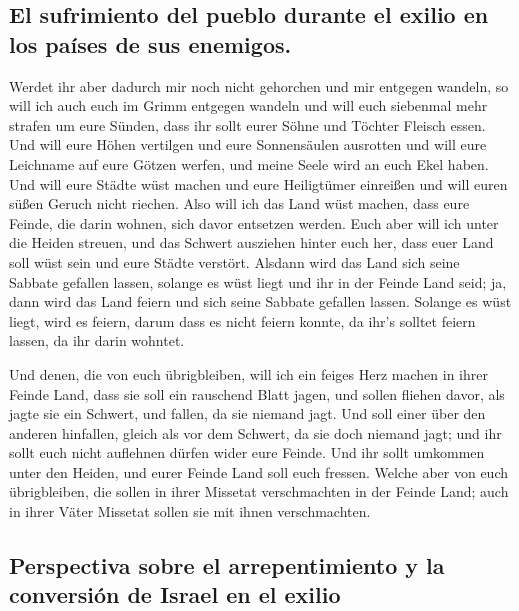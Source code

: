 \hypertarget{el-sufrimiento-del-pueblo-durante-el-exilio-en-los-pauxedses-de-sus-enemigos.}{%
\subsection{El sufrimiento del pueblo durante el exilio en los países de
sus
enemigos.}\label{el-sufrimiento-del-pueblo-durante-el-exilio-en-los-pauxedses-de-sus-enemigos.}}

 Werdet ihr aber dadurch mir noch nicht gehorchen und mir
entgegen wandeln,  so will ich auch euch im Grimm
entgegen wandeln und will euch siebenmal mehr strafen um eure Sünden,
 dass ihr sollt eurer Söhne und Töchter Fleisch essen.
 Und will eure Höhen vertilgen und eure Sonnensäulen
ausrotten und will eure Leichname auf eure Götzen werfen, und meine
Seele wird an euch Ekel haben.  Und will eure Städte wüst
machen und eure Heiligtümer einreißen und will euren süßen Geruch nicht
riechen.  Also will ich das Land wüst machen, dass eure
Feinde, die darin wohnen, sich davor entsetzen werden. 
Euch aber will ich unter die Heiden streuen, und das Schwert ausziehen
hinter euch her, dass euer Land soll wüst sein und eure Städte verstört.
 Alsdann wird das Land sich seine Sabbate gefallen
lassen, solange es wüst liegt und ihr in der Feinde Land seid; ja, dann
wird das Land feiern und sich seine Sabbate gefallen lassen.
 Solange es wüst liegt, wird es feiern, darum dass es
nicht feiern konnte, da ihr's solltet feiern lassen, da ihr darin
wohntet.

 Und denen, die von euch übrigbleiben, will ich ein
feiges Herz machen in ihrer Feinde Land, dass sie soll ein rauschend
Blatt jagen, und sollen fliehen davor, als jagte sie ein Schwert, und
fallen, da sie niemand jagt.  Und soll einer über den
anderen hinfallen, gleich als vor dem Schwert, da sie doch niemand jagt;
und ihr sollt euch nicht auflehnen dürfen wider eure Feinde.
 Und ihr sollt umkommen unter den Heiden, und eurer
Feinde Land soll euch fressen.  Welche aber von euch
übrigbleiben, die sollen in ihrer Missetat verschmachten in der Feinde
Land; auch in ihrer Väter Missetat sollen sie mit ihnen verschmachten.

\hypertarget{perspectiva-sobre-el-arrepentimiento-y-la-conversiuxf3n-de-israel-en-el-exilio}{%
\subsection{Perspectiva sobre el arrepentimiento y la conversión de
Israel en el
exilio}\label{perspectiva-sobre-el-arrepentimiento-y-la-conversiuxf3n-de-israel-en-el-exilio}}

